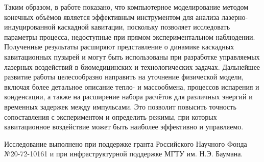 Таким образом, в работе показано, что компьютерное моделирование методом конечных объёмов является эффективным инструментом для анализа лазерно-индуцированной каскадной кавитации, поскольку позволяет исследовать параметры процесса, недоступные при прямом экспериментальном наблюдении. 
Полученные результаты расширяют представление о динамике каскадных кавитационных пузырей и могут быть использованы при разработке управляемых лазерных воздействий в биомедицинских и технологических задачах.
Дальнейшее развитие работы целесообразно направить на уточнение физической модели, включая более детальное описание тепло- и массообмена, процессов испарения и конденсации, а также на расширение набора расчётов для различных энергий и временных задержек между импульсами. 
Это позволит повысить точность сопоставления с экспериментом и определить режимы, при которых кавитационное воздействие может быть наиболее эффективно и управляемо.

Исследование выполнено при поддержке гранта Российского Научного Фонда №20-72-10161 и при инфраструктурной поддержке МГТУ им. Н.Э. Баумана.